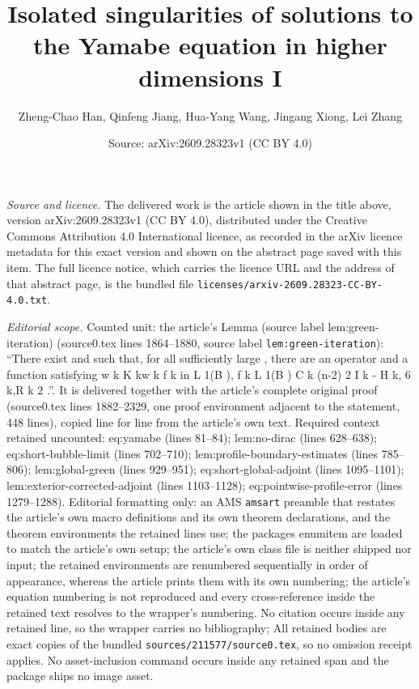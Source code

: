 \documentclass[10pt,a4paper]{amsart}
\title[Isolated singularities of solutions to the Yamabe equation in higher dimensions I]{Isolated singularities of solutions to the Yamabe equation in higher dimensions I}
\author{Zheng-Chao Han, Qinfeng Jiang, Hua-Yang Wang, Jingang Xiong, Lei Zhang}
\date{Source: arXiv:2609.28323v1 (CC BY 4.0)}
\theoremstyle{plain}
\theoremstyle{remark}
\begin{document}
\maketitle

\noindent\emph{Source and licence.} The delivered work is the article shown in the title above, version arXiv:2609.28323v1 (CC BY 4.0), distributed under the Creative Commons Attribution 4.0 International licence, as recorded in the arXiv licence metadata for this exact version and shown on the abstract page saved with this item. The full licence notice, which carries the licence URL and the address of that abstract page, is the bundled file \texttt{licenses/arxiv-2609.28323-CC-BY-4.0.txt}.
\par\smallskip

\noindent\textit{Editorial scope.} Counted unit: the article's Lemma (source label lem:green-iteration) (source0.tex lines 1864--1880, source label \texttt{lem:green-iteration}): ``There exist and such that, for all sufficiently large , there are an operator and a function satisfying w k K kw k f k in L 1(B ), f k L 1(B ) C k (n-2) 2 I k - H k, 6 k,R k 2 .''. It is delivered together with the article's complete original proof (source0.tex lines 1882--2329, one proof environment adjacent to the statement, 448 lines), copied line for line from the article's own text. Required context retained uncounted: eq:yamabe (lines 81--84); lem:no-dirac (lines 628--638); eq:short-bubble-limit (lines 702--710); lem:profile-boundary-estimates (lines 785--806); lem:global-green (lines 929--951); eq:short-global-adjoint (lines 1095--1101); lem:exterior-corrected-adjoint (lines 1103--1128); eq:pointwise-profile-error (lines 1279--1288). Editorial formatting only: an AMS \texttt{amsart} preamble that restates the article's own macro definitions and its own theorem declarations, and the theorem environments the retained lines use; the packages enumitem are loaded to match the article's own setup; the article's own class file is neither shipped nor input; the retained environments are renumbered sequentially in order of appearance, whereas the article prints them with its own numbering; the article's equation numbering is not reproduced and every cross-reference inside the retained text resolves to the wrapper's numbering. No citation occurs inside any retained line, so the wrapper carries no bibliography; All retained bodies are exact copies of the bundled \texttt{sources/211577/source0.tex}, so no omission receipt applies. No asset-inclusion command occurs inside any retained span and the package ships no image asset.
\end{document}

